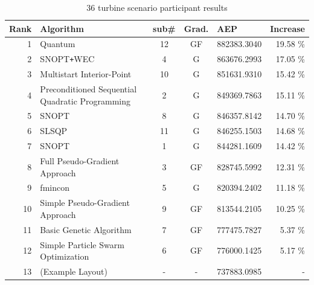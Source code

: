 \documentclass[conf,hidelinks]{new-aiaa} %
\begin{document}
\begin{table}[h!]
    \begin{center}
        \caption{36 turbine scenario participant results}
        \label{tab:results2}
        \begin{tabular}{r l c c l r}
            \hline
            Rank	& Algorithm											& sub\#	& Grad.	& AEP			& Increase		\\	%
            \hline
            1       & Quantum								            & 12    & GF	& 882383.3040	&	19.58 \% 	\\ %
            2		& SNOPT\texttt{+}WEC								& 4		& G		& 863676.2993   &	17.05 \% 	\\ %
            3		& Multistart Interior-Point							& 10	& G		& 851631.9310	&	15.42 \% 	\\ %
            4		& Preconditioned Sequential Quadratic Programming	& 2     & G		& 849369.7863	&	15.11 \% 	\\ %
			5		& SNOPT												& 8     & G		& 846357.8142	&	14.70 \% 	\\ %
			6		& SLSQP												& 11	& G		& 846255.1503	&	14.68 \% 	\\ %
            7		& SNOPT												& 1     & G		& 844281.1609	&	14.42 \% 	\\ %
            8		& Full Pseudo-Gradient Approach						& 3     & GF	& 828745.5992	&	12.31 \% 	\\ %
            9		& fmincon											& 5     & G		& 820394.2402	&	11.18 \% 	\\ %
            10		& Simple Pseudo-Gradient Approach					& 9     & GF	& 813544.2105	&	10.25 \% 	\\ %
            11		& Basic Genetic Algorithm							& 7     & GF	& 777475.7827	&	5.37 \% 	\\ %
            12		& Simple Particle Swarm Optimization				& 6     & GF	& 776000.1425	&	5.17 \% 	\\ %
            13		& (Example Layout)									& -		& -		& 737883.0985	&	- 			\\ %
            \hline
        \end{tabular}
    \end{center}


\end{table}
\end{document}
